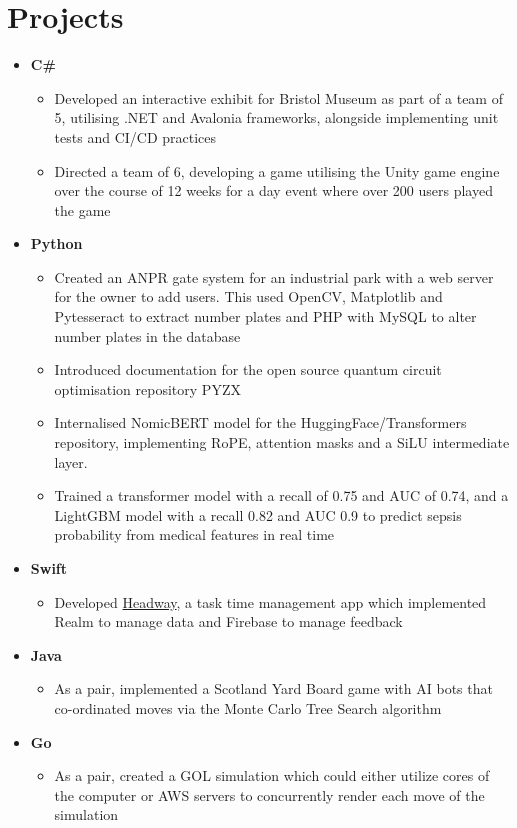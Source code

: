 \documentclass[a4paper,11pt]{article}
\newcommand{\resumeItemListStart}{\begin{justify}\begin{itemize}[leftmargin=3ex, rightmargin=2ex, noitemsep,labelsep=1.2mm,itemsep=0mm]\small}
\newcommand{\resumeItemListEnd}{\end{itemize}\end{justify}\vspace{-2mm}}
\begin{document}
\section{\textbf{Projects}}
\resumeItemListStart
\item {\textbf{C\#}}
        \begin{itemize}
            \item Developed an interactive exhibit for Bristol Museum as part of a team of 5, utilising .NET and Avalonia frameworks, alongside implementing unit tests and CI/CD practices
            \item Directed a team of 6, developing a game utilising the Unity game engine over the course of 12 weeks for a day event where over 200 users played the game
        \end{itemize}
    \item {\textbf{Python}}
        \begin{itemize}
            \item Created an ANPR gate system for an industrial park with a web server for the owner to add users. This used OpenCV, Matplotlib and Pytesseract to extract number plates and PHP with MySQL to alter number plates in the database
            \item Introduced documentation for the open source quantum circuit optimisation repository PYZX
            \item Internalised NomicBERT model for the HuggingFace/Transformers repository, implementing RoPE, attention masks and a SiLU intermediate layer.
            \item Trained a transformer model with a recall of 0.75 and AUC of 0.74, and a LightGBM model with a recall 0.82 and AUC 0.9 to predict sepsis probability from medical features in real time
        \end{itemize}
    \item {\textbf{Swift}}
        \begin{itemize}
            \item Developed \href{https://headwayapp.org/}{Headway}, a task time management app which implemented Realm to manage data and Firebase to manage feedback
        \end{itemize}
    \item {\textbf{Java}}
        \begin{itemize}
            \item As a pair, implemented a Scotland Yard Board game with AI bots that co-ordinated moves via the Monte Carlo Tree Search algorithm
        \end{itemize}
    \item {\textbf{Go}}
        \begin{itemize}
            \item  As a pair, created a GOL simulation which could either utilize cores of the computer or AWS servers to concurrently render each move of the simulation
        \end{itemize}
\resumeItemListEnd
\end{document}
